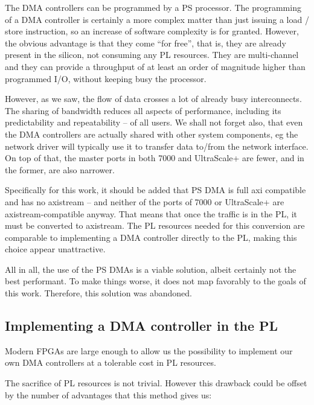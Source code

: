 The DMA controllers can be programmed by a PS processor. The programming of a DMA controller
is certainly a more complex matter than just issuing a load / store instruction,
so an increase of software complexity is for granted.
However, the obvious advantage is that they come ``for free'', that is,
they are already present in the silicon, not consuming any PL resources.
They are multi-channel and they can provide a throughput of at least an order
of magnitude higher than programmed I/O, without keeping busy the processor.

However, as we saw, the flow of data crosses a lot of already busy interconnects.
The sharing of bandwidth reduces all aspects of performance,
including its predictability and repeatability -- of all users.
We shall not forget also, that even the DMA controllers are actually shared with
other system components, eg the network driver will typically use it to transfer data
to/from the network interface. On top of that, the master ports in both 7000 and UltraScale+
are fewer, and in the former, are also narrower.

Specifically for this work, it should be added that PS DMA is full \gls{axi} compatible
and has no \gls{axistream} -- and neither of the ports of 7000 or UltraScale+ are
\gls{axistream}-compatible anyway. That means that once the traffic is in the PL,
it must be converted to \gls{axistream}.
The PL resources needed for this conversion are comparable to implementing a DMA
controller directly to the PL, making this choice appear unattractive.

All in all, the use of the PS DMAs is a viable solution,
albeit certainly not the best performant.
To make things worse, it does not map favorably to the goals of this work.
Therefore, this solution was abandoned.

\subsection{Implementing a DMA controller in the PL}

Modern FPGAs are large enough to allow us
the possibility to implement our own DMA controllers
at a tolerable cost in PL resources.

The sacrifice of PL resources is not trivial.
However this drawback could be offset by the number of
advantages that this method gives us:


